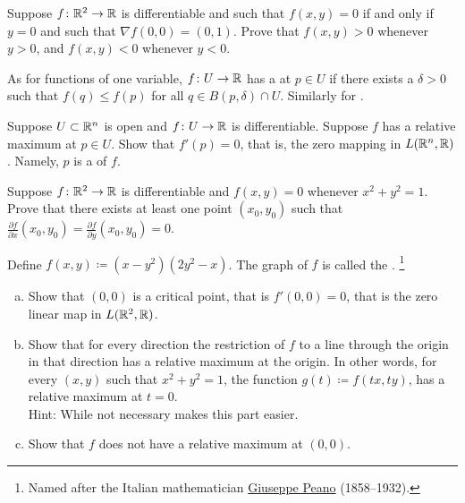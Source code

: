 \begin{exercise}
Suppose $f \colon {\mathbb{R}}^2 \to {\mathbb{R}}$ is differentiable and such that
$f(x,y) = 0$ if and only if $y=0$ and such that $\nabla f(0,0) = (0,1)$.
Prove that $f(x,y) > 0$ whenever $y > 0$, and
$f(x,y) < 0$ whenever $y < 0$.
\end{exercise}

\begin{exnote}
\pagebreak[2]
As for functions of one variable, $f \colon U \to {\mathbb{R}}$ has a
\emph{} at $p \in U$ if there exists
a $\delta >0$ such that $f(q) \leq f(p)$ for all $q \in B(p,\delta) \cap U$.
Similarly for \emph{}.
\end{exnote}

\begin{exercise} \label{exercise:mv:maximumcritical}
Suppose $U \subset {\mathbb{R}}^n$ is open and
$f \colon U \to {\mathbb{R}}$ is differentiable.  Suppose $f$ has a relative maximum
at $p \in U$.  Show that $f'(p) = 0$, that is, the zero mapping in
$L({\mathbb{R}}^n,{\mathbb{R}})$.  Namely, $p$ is a
\emph{} of $f$.
\end{exercise}

\begin{exercise}
Suppose $f \colon {\mathbb{R}}^2 \to {\mathbb{R}}$ is differentiable and 
$f(x,y) = 0$ whenever $x^2+y^2 = 1$.
Prove that there exists at least
one point $(x_0,y_0)$ such that
$\frac{\partial f}{\partial x}(x_0,y_0) = \frac{\partial f}{\partial
y}(x_0,y_0) = 0$.
\end{exercise}

\begin{exercise} \label{exercise:peano}
Define $f(x,y) \coloneqq ( x-y^2 ) ( 2 y^2 - x)$.  The graph of $f$ is called
the \emph{}.%
\footnote{Named after the Italian mathematician
\href{https://en.wikipedia.org/wiki/Giuseppe_Peano}{Giuseppe Peano}
(1858--1932).}
\begin{enumerate}[a)]
\item
Show that
$(0,0)$ is a critical point, that is $f'(0,0) = 0$, that is the zero
linear map in $L({\mathbb{R}}^2,{\mathbb{R}})$.
\item
Show that for every direction the restriction of $f$ to a line through the origin
in that direction has a relative maximum at the origin.  In other words,
for every $(x,y)$ such that $x^2+y^2=1$, the function $g(t) \coloneqq f(tx,ty)$,
has a relative maximum at $t=0$.\\
Hint: While not necessary
makes
this part easier.
\item
Show that $f$ does not have a relative maximum at $(0,0)$.
\end{enumerate}
\end{exercise}

